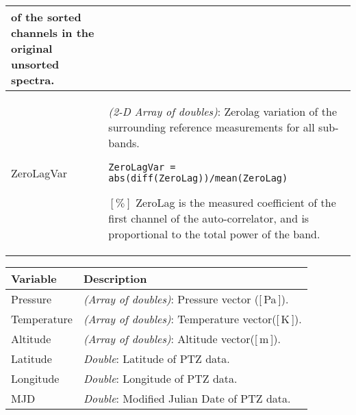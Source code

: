 \begin{longtable}{| p{} | p{} |}
                       of the sorted channels in the original unsorted spectra. \\ \hline 
     ZeroLagVar      & \emph{(2-D Array of doubles)}: Zerolag variation of the surrounding reference measurements for all sub-bands.
                       \begin{verbatim}ZeroLagVar = abs(diff(ZeroLag))/mean(ZeroLag)\end{verbatim} \([\%]\)
                        ZeroLag is the measured coefficient of the first channel of the auto-correlator,
                        and is proportional to the total power of the band. \\ \hline
\hline
\end{longtable}

\clearpage
\newpage

\begin{table}
\caption{ \smr\ PTZ data format. 
Example URL: \url{http://malachite.rss.chalmers.se/rest_api/v4/ptz/2015-01-03/AC1/2/7002887494}}
\label{table:ptzdataformat}
\begin{longtable}{| p{} | p{} |}
\hline
  \textbf{Variable} & \textbf{Description} \\
  \hline
    Pressure        & \emph{(Array of doubles)}: Pressure vector ([\,Pa\,]).  \\ \hline
    Temperature     & \emph{(Array of doubles)}: Temperature vector([\,K\,]). \\ \hline
    Altitude        & \emph{(Array of doubles)}: Altitude vector([\,m\,]).    \\ \hline
    Latitude        & \emph{Double}: Latitude of PTZ data.                    \\ \hline
    Longitude       & \emph{Double}: Longitude of PTZ data.                   \\ \hline
    MJD             & \emph{Double}: Modified Julian Date of PTZ data.        \\ \hline 
\hline
\end{longtable}
\end{table}
\addtocounter{table}{-1}



